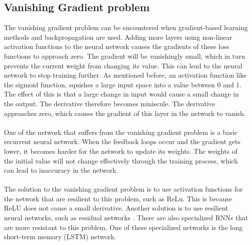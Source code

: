 \subsection{Vanishing Gradient problem}\label{vgp}
The vanishing gradient problem can be encountered when gradient-based learning methods and backpropagation are used. Adding more layers using non-linear activation functions to the neural network causes the gradients of these loss functions to approach zero. The gradient will be vanishingly small, which in turn prevents the current weight from changing its value. This can lead to the neural network to stop training further. As mentioned before, an activation function like the sigmoid function, squishes a large input space into a value between 0 and 1. The effect of this is that a large change in input would cause a small change in the output. The derivative therefore becomes miniscule. The derivative approaches zero, which causes the gradient of this layer in the network to vanish. \\\\
One of the network that suffers from the vanishing gradient problem is a basic recurrent neural network. When the feedback loops occur and the gradient gets lower, it becomes harder for the network to update its weights. The weights of the initial value will not change effectively through the training process, which can lead to inaccuracy in the network. \\\\
The solution to the vanishing gradient problem is to use activation functions for the network that are resilient to this problem, such as ReLu. This is because ReLU does not cause a small derivative. Another solution is to use resilient neural networks, such as residual networks \cite{DBLP:journals/corr/HeZRS15}. There are also specialized RNNs that are more resistant to this problem. One of these specialized networks is the long short-term memory (LSTM) network. 

